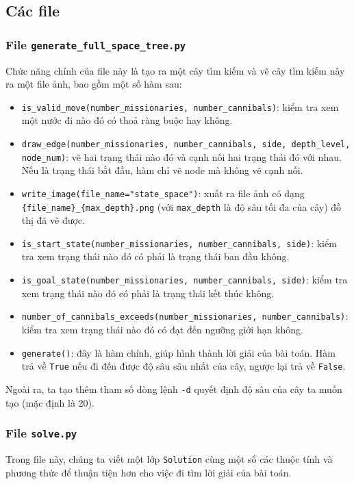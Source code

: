 \documentclass[a4paper, 11pt]{article}
\begin{document}
\subsection{Các file}
\subsubsection{File \lstinline|generate_full_space_tree.py|}
Chức năng chính của file này là tạo ra một cây tìm kiếm và vẽ cây tìm kiếm này ra một file ảnh, bao gồm một số hàm sau:
\begin{itemize}
    \item \lstinline|is_valid_move(number_missionaries, number_cannibals)|: kiểm tra xem một nước đi nào đó có thoả ràng buộc hay không.
    \item \lstinline|draw_edge(number_missionaries, number_cannibals, side, depth_level, node_num)|: vẽ hai trạng thái nào đó và cạnh nối hai trạng thái đó với nhau. Nếu là trạng thái bắt đầu, hàm chỉ vẽ node mà không vẽ cạnh nối.
    \item \lstinline|write_image(file_name="state_space")|: xuất ra file ảnh có dạng \lstinline|{file_name}_{max_depth}.png| (với \lstinline|max_depth| là độ sâu tối đa của cây) đồ thị đã vẽ được.
    \item \lstinline|is_start_state(number_missionaries, number_cannibals, side)|: kiểm tra xem trạng thái nào đó có phải là trạng thái ban đầu không.
    \item \lstinline|is_goal_state(number_missionaries, number_cannibals, side)|: kiểm tra xem trạng thái nào đó có phải là trạng thái kết thúc không.
    \item \lstinline|number_of_cannibals_exceeds(number_missionaries, number_cannibals)|: kiểm tra xem trạng thái nào đó có đạt đến ngưỡng giới hạn không.
    \item \lstinline|generate()|: đây là hàm chính, giúp hình thành lời giải của bài toán. Hàm trả về \lstinline|True| nếu đi đến được độ sâu sâu nhất của cây, ngược lại trả về \lstinline|False|.
\end{itemize}
Ngoài ra, ta tạo thêm tham số dòng lệnh \lstinline|-d| quyết định độ sâu của cây ta muốn tạo (mặc định là 20).

\subsubsection{File \lstinline|solve.py|}
Trong file này, chúng ta viết một lớp \lstinline|Solution| cùng một số các thuộc tính và phương thức để thuận tiện hơn cho việc đi tìm lời giải của bài toán. 
\end{document}
